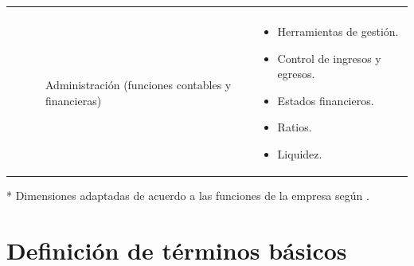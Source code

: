 \begin{table}
\begin{tabular}{|p{3cm}|p{4cm}|p{3.5cm}|p{3.5cm}|p{5cm}|}
\begin{itemize}[noitemsep]
     \end{itemize} \\ \cline{4-5}
     &  &  & Administraci\'on (funciones contables y financieras) &
     \begin{itemize}[noitemsep]
       \item Herramientas de gesti\'on.
       \item Control de ingresos y egresos.
       \item Estados financieros.
       \item Ratios.
       \item Liquidez.
     \end{itemize} \\ \hline
    \end{tabular}
    * Dimensiones adaptadas de acuerdo a las funciones de la empresa seg\'un \cite{fayol}.
\end{table}
\newpage
\section{Definici\'on de t\'erminos b\'asicos}

